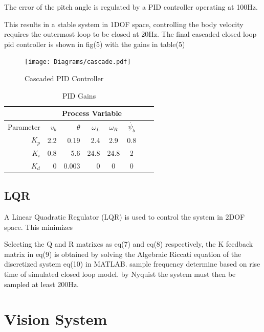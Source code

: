         The error of the pitch angle is regulated by a PID controller operating at 100Hz. 
        
        This results in a stable system in 1DOF space, controlling the body velocity requires the outermost loop to be closed at 20Hz.
        The final cascaded closed loop pid controller is shown in fig(5) with the gains in table(5)

        \begin{figure}[H]
            \texttt{[image: Diagrams/cascade.pdf]}
            \caption{Cascaded PID Controller}
        \end{figure}

        \begin{table}[H]
            \centering
            \begin{tabular}{|r|r|r|r|c|c|c|c}
                \hline
                & \multicolumn{5}{c|}{Process Variable}  \\
                \hline
                Parameter & $v_b$ & $\theta$  & $\omega_L$ & $\omega_R$ & $\dot{\psi_b}$ \\
                \hline      
                $K_p$ & 2.2 & 0.19 & 2.4 & 2.9 & 0.8 \\
                $K_i$ & 0.8 & 5.6 & 24.8 & 24.8 & 2\\
                $K_d$ & 0 & 0.003 & 0 & 0  &  0\\
                \hline
            \end{tabular}
            \caption{PID Gains}
        \end{table}
        \pagebreak{}
        \subsection{LQR}
        A Linear Quadratic Regulator (LQR) is used to control the system in 2DOF space.
        This minimizes 
        
       
        Selecting the Q and R matrixes as eq(7) and eq(8) respectively, 
        the K feedback matrix in eq(9) is obtained by solving the Algebraic Riccati
        equation of the discretized system eq(10) in MATLAB.
        sample frequency determine based on rise time of simulated closed loop model. 
        by Nyquist the system must then be sampled at least 200Hz. 

        \pagebreak{}
        \section{Vision System}

